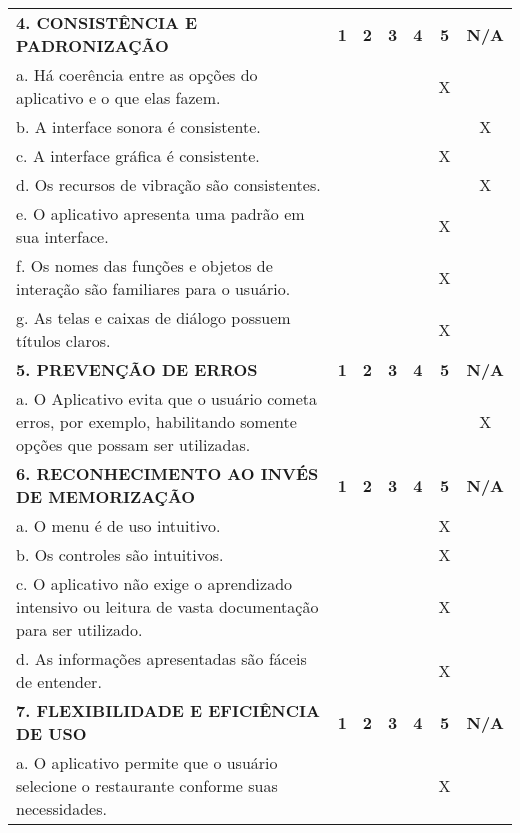 \documentclass[portuguese,oneside]{tcc}
\begin{document}
\begin{center}
\begin{longtabu}{|L{25em}|c|c|c|c|c|c|}
													\textbf{4. CONSISTÊNCIA E PADRONIZAÇÃO} & \textbf{1} & \textbf{2} & \textbf{3} & \textbf{4} & \textbf{5} & \textbf{N/A} \\ 
													a. Há coerência entre as opções do aplicativo e o que elas fazem. & & & & & X & \\ 
													b. A interface sonora é consistente. & & & & & & X \\ 
													c. A interface gráfica é consistente. & & & & & X & \\ 
													d. Os recursos de vibração são consistentes. & & & & & & X \\ 
													e. O aplicativo apresenta uma padrão em sua interface. & & & & & X & \\ 
													f. Os nomes das funções e objetos de interação são familiares para o usuário. & & & & & X & \\ 
													g. As telas e caixas de diálogo possuem títulos claros. & & & & & X & \\ 
													\textbf{5. PREVENÇÃO DE ERROS} & \textbf{1} & \textbf{2} & \textbf{3} & \textbf{4} & \textbf{5} & \textbf{N/A} \\ 
													a. O Aplicativo evita que o usuário cometa erros, por exemplo, habilitando somente opções que possam ser utilizadas. & & & & & & X \\ 
													\textbf{6. RECONHECIMENTO AO INVÉS DE MEMORIZAÇÃO} & \textbf{1} & \textbf{2} & \textbf{3} & \textbf{4} & \textbf{5} & \textbf{N/A} \\ 
													a. O  menu é de uso intuitivo. & & & & & X & \\ 
													b. Os controles são intuitivos. & & & & & X & \\ 
													c. O aplicativo não exige o aprendizado intensivo ou leitura de vasta documentação para ser utilizado. & & & & & X & \\ 
													d. As informações apresentadas são fáceis de entender. & & & & & X & \\ 
													\textbf{7. FLEXIBILIDADE E EFICIÊNCIA DE USO} & \textbf{1} & \textbf{2} & \textbf{3} & \textbf{4} & \textbf{5} & \textbf{N/A} \\ 
													a. O aplicativo permite que o usuário selecione o restaurante conforme suas necessidades. & & & & & X & \\ 

\end{longtabu}
\end{center}
\end{document}
